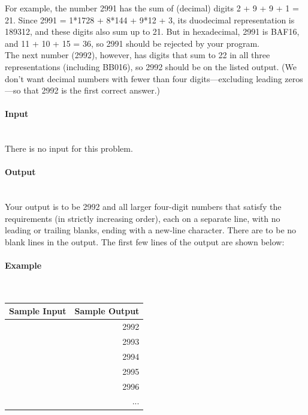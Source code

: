 \documentclass{article}
\begin{document}
For example, the number 2991 has the sum of (decimal) digits 2 + 9 + 9 + 1 = 21. Since 2991 = 1*1728 + 8*144 + 9*12 + 3, its duodecimal representation is 189312, and these digits also sum up to 21. But in hexadecimal, 2991 is BAF16, and 11 + 10 + 15 = 36, so 2991 should be rejected by your program.\\

The next number (2992), however, has digits that sum to 22 in all three representations (including BB016), so 2992 should be on the listed output. (We don’t want decimal numbers with fewer than four digits—excluding leading zeros—so that 2992 is the first correct answer.) \\

\paragraph{Input} \mbox{} \\

There is no input for this problem.

\paragraph{Output}\mbox{} \\

Your output is to be 2992 and all larger four-digit numbers that satisfy the requirements (in strictly increasing order), each on a separate line, with no leading or trailing blanks, ending with a new-line character. There are to be no blank lines in the output. The first few lines of the output are shown below:

\paragraph{Example}\mbox{} \\

\begin{table}[h]
    \centering
    \begin{tabular}{|l|r|}
        \hline
        \textbf{Sample Input} & \textbf{Sample Output} \\
        \hline
            & 2992  \\ 
            & 2993 \\ 
            & 2994 \\ 
            & 2995 \\ 
            & 2996\\ 
            & ... \\ \hline
    \end{tabular}
\end{table}
\end{document}
